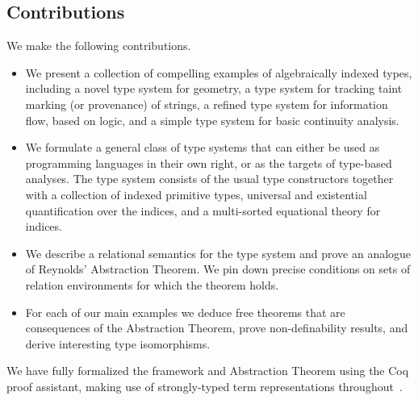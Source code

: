 
\subsection{Contributions}
\label{sec:contributions}

We make the following contributions. 
\begin{itemize}
\item 
We present a collection of compelling examples of algebraically indexed
types, including a novel type system for geometry, a type system for
tracking taint marking (or provenance) of strings, a refined type
system for information flow, based on logic, and a simple type
system for basic continuity analysis.
\item 
We formulate a general class of type systems that can either be
used as programming languages in their own right, or as the targets of
type-based analyses. The type system consists of the usual type
constructors together with a collection of indexed primitive types,
universal and existential quantification over the indices, and a
multi-sorted equational theory for indices. 
\item
We describe a relational semantics for the type system and prove an analogue
of Reynolds' Abstraction Theorem. We pin down precise conditions on sets of
relation environments for which the theorem holds.
\item
For each of our main examples we deduce free theorems that are consequences of
the Abstraction Theorem, prove non-definability results, and derive interesting
type isomorphisms.
\end{itemize}
We have fully formalized the framework and Abstraction Theorem using the Coq proof assistant,
making use of strongly-typed term representations throughout~\cite{TypedSyntax}.

